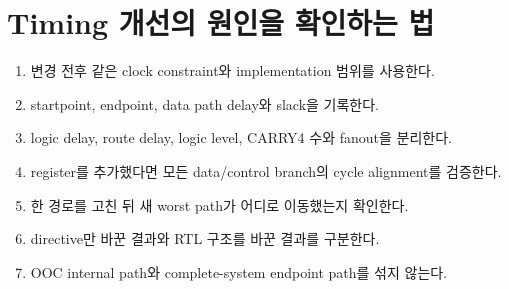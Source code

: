 \section{Timing 개선의 원인을 확인하는 법}

\begin{checklistbox}
\begin{enumerate}
  \item 변경 전후 같은 clock constraint와 implementation 범위를 사용한다.
  \item startpoint, endpoint, data path delay와 slack을 기록한다.
  \item logic delay, route delay, logic level, CARRY4 수와 fanout을 분리한다.
  \item register를 추가했다면 모든 data/control branch의 cycle alignment를 검증한다.
  \item 한 경로를 고친 뒤 새 worst path가 어디로 이동했는지 확인한다.
  \item directive만 바꾼 결과와 RTL 구조를 바꾼 결과를 구분한다.
  \item OOC internal path와 complete-system endpoint path를 섞지 않는다.
\end{enumerate}
\end{checklistbox}
